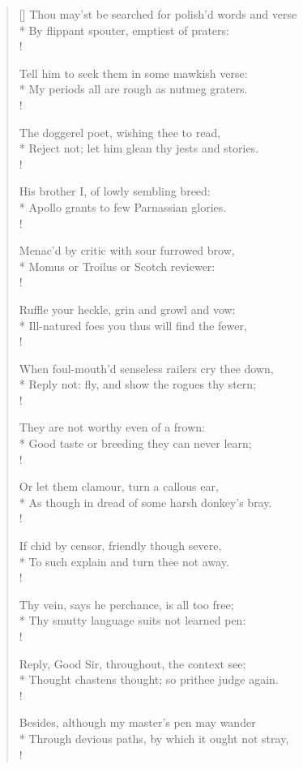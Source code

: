 \begin{verse}[\versewidth]
Thou may'st be searched for polish'd words and verse\\*
By flippant spouter, emptiest of praters:\\!

Tell him to seek them in some mawkish verse:\\*
My periods all are rough as nutmeg graters.\\!

The doggerel poet, wishing thee to read,\\*
Reject not; let him glean thy jests and stories.\\!

His brother I, of lowly sembling breed:\\*
Apollo grants to few Parnassian glories.\\!

Menac'd by critic with sour furrowed brow,\\*
Momus or Troilus or Scotch reviewer:\\!

Ruffle your heckle, grin and growl and vow:\\*
Ill-natured foes you thus will find the fewer,\\!

When foul-mouth'd senseless railers cry thee down,\\*
Reply not: fly, and show the rogues thy stern;\\!

They are not worthy even of a frown:\\*
Good taste or breeding they can never learn;\\!

Or let them clamour, turn a callous ear,\\*
As though in dread of some harsh donkey's bray.\\!

If chid by censor, friendly though severe,\\*
To such explain and turn thee not away.\\!

Thy vein, says he perchance, is all too free;\\*
Thy smutty language suits not learned pen:\\!

Reply, Good Sir, throughout, the context see;\\*
Thought chastens thought; so prithee judge again.\\!

Besides, although my master's pen may wander\\*
Through devious paths, by which it ought not stray,\\!


\end{verse}
